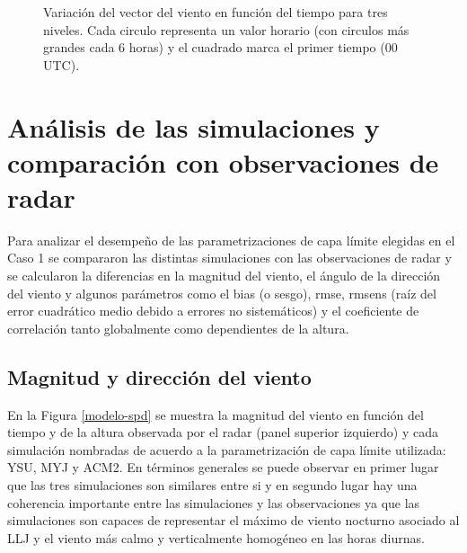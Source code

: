 \documentclass[12pt,spanish,oneside, a4paper]{book}
\begin{document}
\begin{figure}

{\centering {}\newline{}

}

\caption{Variación del vector del viento en función del tiempo para tres niveles. Cada circulo representa un valor horario (con circulos más grandes cada 6 horas) y el cuadrado marca el primer tiempo (00 UTC). \label{hodografa-n}}\label{fig:hodografa-nivel}
\end{figure}

\section{Análisis de las simulaciones y comparación con observaciones de
radar}\label{analisis-de-las-simulaciones-y-comparacion-con-observaciones-de-radar}

Para analizar el desempeño de las parametrizaciones de capa límite
elegidas en el Caso 1 se compararon las distintas simulaciones con las
observaciones de radar y se calcularon la diferencias en la magnitud del
viento, el ángulo de la dirección del viento y algunos parámetros como
el bias (o sesgo), rmse, rmsens (raíz del error cuadrático medio debido
a errores no sistemáticos) y el coeficiente de correlación tanto
globalmente como dependientes de la altura.

\subsection{Magnitud y dirección del
viento}\label{magnitud-y-direccion-del-viento}

En la Figura \ref{modelo-spd} se muestra la magnitud del viento en
función del tiempo y de la altura observada por el radar (panel superior
izquierdo) y cada simulación nombradas de acuerdo a la parametrización
de capa límite utilizada: YSU, MYJ y ACM2. En términos generales se
puede observar en primer lugar que las tres simulaciones son similares
entre si y en segundo lugar hay una coherencia importante entre las
simulaciones y las observaciones ya que las simulaciones son capaces de
representar el máximo de viento nocturno asociado al LLJ y el viento más
calmo y verticalmente homogéneo en las horas diurnas.
\end{document}
